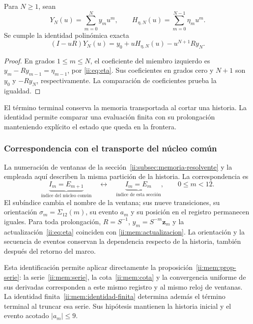 \begin{proposition}
Para $N\geq1$, sean
\[
Y_N(u)=\sum_{m=0}^N y_mu^m,\qquad
H_{\eta,N}(u)=\sum_{m=0}^{N-1}\eta_mu^m.
\]
Se cumple la identidad polinómica exacta
\begin{equation}
(I-uR)Y_N(u)=y_0+uH_{\eta,N}(u)-u^{N+1}Ry_N.
\label{ii:mem:identidad-finita}
\end{equation}
\end{proposition}
\begin{proof}
En grados $1\leq m\leq N$, el coeficiente del miembro izquierdo es
$y_m-Ry_{m-1}=\eta_{m-1}$, por \eqref{ii:eq:eta}.
Sus coeficientes en grados cero y $N+1$ son $y_0$ y $-Ry_N$,
respectivamente. La comparación de coeficientes prueba la igualdad.
\end{proof}

El término terminal conserva la memoria transportada al cortar una historia.
La identidad permite comparar una evaluación finita con su prolongación
manteniendo explícito el estado que queda en la frontera.

\subsubsection{Correspondencia con el transporte del núcleo común}

La numeración de ventanas de la sección~\ref{ii:subsec:memoria-resolvente}
y la empleada aquí describen la misma partición de la historia. La
correspondencia es
\[
 \underbrace{I_m=E_{m+1}}_{\text{índice del núcleo común}}
 \quad\longleftrightarrow\quad
 \underbrace{I_m=E_m}_{\text{índice de esta sección}},
 \qquad 0\leq m<12.
\]
El subíndice cambia el nombre de la ventana; sus nueve transiciones,
su orientación \(\sigma_m=\Sigma_{12}(m)\), su evento \(a_m\) y
su posición en el registro permanecen iguales. Para toda prolongación,
\(R=S^{-1}\), \(y_m=S^{-m}\mathbf z_m\) y la
actualización~\eqref{ii:eq:eta} coinciden con
\eqref{ii:mem:actualizacion}. La orientación y la secuencia de eventos
conservan la dependencia respecto de la historia, también después del
retorno del marco.

Esta identificación permite aplicar directamente la
proposición~\ref{ii:mem:prop-serie}: la serie~\eqref{ii:mem:serie}, la
cota~\eqref{ii:mem:cota} y la convergencia uniforme de sus derivadas
corresponden a este mismo registro y al mismo reloj de ventanas. La
identidad finita~\eqref{ii:mem:identidad-finita} determina además el término
terminal al truncar esa serie. Sus hipótesis mantienen la historia inicial
y el evento acotado \(|a_m|\leq9\).

